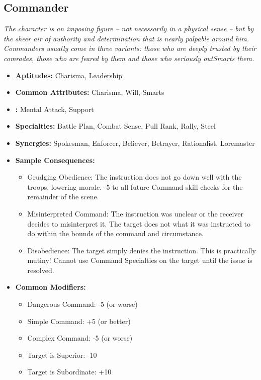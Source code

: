 \subsection{Commander}\label{Commander}
\textit{The character is an imposing figure – not necessarily in a physical sense – but by the sheer air of authority and determination that is nearly palpable around him.
Commanders usually come in three variants: those who are deeply trusted by their comrades, those who are feared by them and those who seriously outSmarts them.}
\begin{itemize}
	\item \textbf{Aptitudes:} Charisma, Leadership
	\item \textbf{Common Attributes:} Charisma, Will, Smarts
	\item \textbf{:} Mental Attack, Support
	\item \textbf{Specialties:} Battle Plan, Combat Sense, Pull Rank, Rally, Steel
	\item \textbf{Synergies:} Spokesman, Enforcer, Believer, Betrayer, Rationalist, Loremaster
	\item \textbf{Sample Consequences:} 
	\begin{itemize}
		\item Grudging Obedience: The instruction does not go down well with the troops, lowering morale. -5 to all future Command skill checks for the remainder of the scene.
		\item Misinterpreted Command: The instruction was unclear or the receiver decides to misinterpret it. The target does not what it was instructed to do within the bounds of the command and circumstance.
		\item Disobedience: The target simply denies the instruction. This is practically mutiny! Cannot use Command Specialties on the target until the issue is resolved.
	\end{itemize}
	\item \textbf{Common Modifiers:}
	\begin{itemize}
		\item Dangerous Command: -5 (or worse)
		\item Simple Command: +5 (or better)
		\item Complex Command: -5 (or worse)
		\item Target is Superior: -10
		\item Target is Subordinate: +10
	\end{itemize}
\end{itemize}

